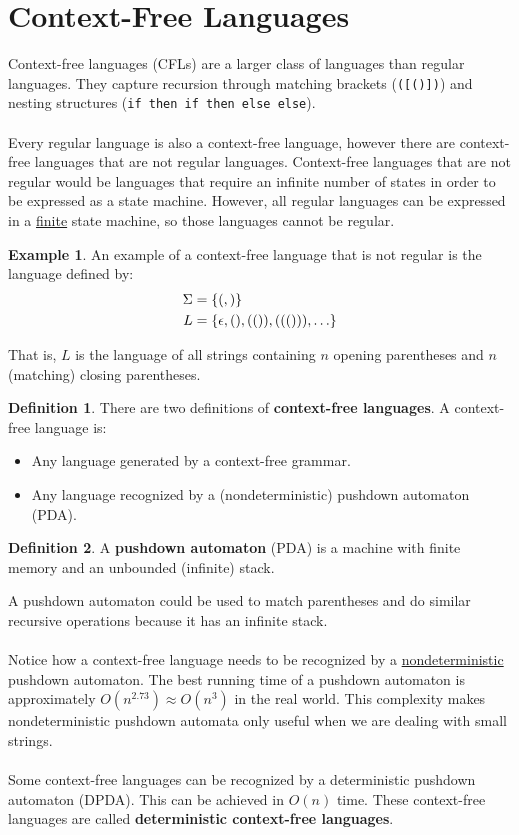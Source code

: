 \documentclass[]{article}
\DeclarePairedDelimiter{\set}{\lbrace}{\rbrace}
\theoremstyle{definition}
\newtheorem*{defn}{Definition}
\newtheorem{ex}{Example}[section]
\newcommand{\lecture}[1]{\marginpar{{\footnotesize $\leftarrow$ \underline{#1}}}}
\begin{document}
	\section{Context-Free Languages} \lecture{February 25, 2013}
		Context-free languages (CFLs) are a larger class of languages than regular languages. They capture recursion through matching brackets (\verb+([()])+) and nesting structures (\verb+if then if then else else+).
		\\ \\
		Every regular language is also a context-free language, however there are context-free languages that are not regular languages. Context-free languages that are not regular would be languages that require an infinite number of states in order to be expressed as a state machine. However, all regular languages can be expressed in a \underline{finite} state machine, so those languages cannot be regular.
		\begin{ex}
			An example of a context-free language that is not regular is the language defined by:
			\begin{align*}
				\Sigma &= \set{(, )} \\
				L &= \set{\epsilon, (), (()), ((())), \ldots}
			\end{align*}

			That is, $L$ is the language of all strings containing $n$ opening parentheses and $n$ (matching) closing parentheses.
		\end{ex}
		
		\begin{defn}
			There are two definitions of \textbf{context-free languages}. A context-free language is:
			\begin{itemize}
				\item Any language generated by a context-free grammar.
				\item Any language recognized by a (nondeterministic) pushdown automaton (PDA).
			\end{itemize}
		\end{defn}

		\begin{defn}
			A \textbf{pushdown automaton} (PDA) is a machine with finite memory and an unbounded (infinite) stack.
		\end{defn}

		A pushdown automaton could be used to match parentheses and do similar recursive operations because it has an infinite stack.
		\\ \\
		Notice how a context-free language needs to be recognized by a \underline{nondeterministic} pushdown automaton. The best running time of a pushdown automaton is approximately $O(n^{2.73}) \approx O(n^3)$ in the real world. This complexity makes nondeterministic pushdown automata only useful when we are dealing with small strings.
		\\ \\
		Some context-free languages can be recognized by a deterministic pushdown automaton (DPDA). This can be achieved in $O(n)$ time. These context-free languages are called \textbf{deterministic context-free languages}.
\end{document}
